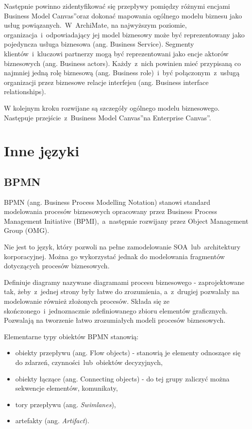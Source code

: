 Następnie powinno zidentyfikować się przepływy pomiędzy różnymi encjami \quotedblbase Business Model Canvas\textquotedblright oraz dokonać mapowania ogólnego modelu biznesu jako usług powiązanych.~W~ArchiMate, na najwyższym poziomie, organizacja~i~odpowiadający jej model biznesowy może być reprezentowany jako pojedyncza usługa biznesowa (ang. Business Service). Segmenty klientów~i~kluczowi partnerzy mogą być reprezentowani jako encje aktorów biznesowych (ang. Business actors). Każdy~z~nich powinien mieć przypisaną co najmniej jedną rolę biznesową (ang. Business role)~i~być połączonym~z~usługą organizacji przez biznesowe relacje interfejsu (ang. Business interface relationships).

W kolejnym kroku rozwijane są szczegóły ogólnego modelu biznesowego. Następuje przejście~z~\quotedblbase Business Model Canvas\textquotedblright na \quotedblbase Enterprise Canvas\textquotedblright. 


\section{Inne języki}

\subsection{BPMN}
BPMN (ang. Business Process Modelling Notation) stanowi standard modelowania procesów biznesowych opracowany przez Business Process Management Initiative (BPMI),~a~następnie rozwijany przez Object Management Group (OMG). 

Nie jest to język, który pozwoli na pełne zamodelowanie SOA~lub~architektury korporacyjnej. Można go wykorzystać jednak do modelowania fragmentów dotyczących procesów biznesowych.

Definiuje diagramy nazywane diagramami procesu biznesowego - zaprojektowane tak, żeby~z~jednej strony były łatwe do zrozumienia, a~z~drugiej pozwalały na modelowanie również złożonych procesów. Składa się ze skończonego~i~jednoznacznie zdefiniowanego zbioru elementów graficznych. Pozwalają na tworzenie łatwo zrozumiałych  modeli procesów biznesowych.

Elementarne typy obiektów BPMN stanowią: 
\begin{itemize}
\item{obiekty przepływu (ang. Flow objects) - stanowią je elementy odnoszące się do zdarzeń, czynności~lub~obiektów decyzyjnych,}
\item{obiekty łączące (ang. Connecting objects) - do tej grupy zaliczyć można sekwencje elementów, komunikaty,} 
\item{tory przepływu (ang. \emph{Swimlanes}),}
\item{artefakty (ang. \emph{Artifact}).}
\end{itemize}

